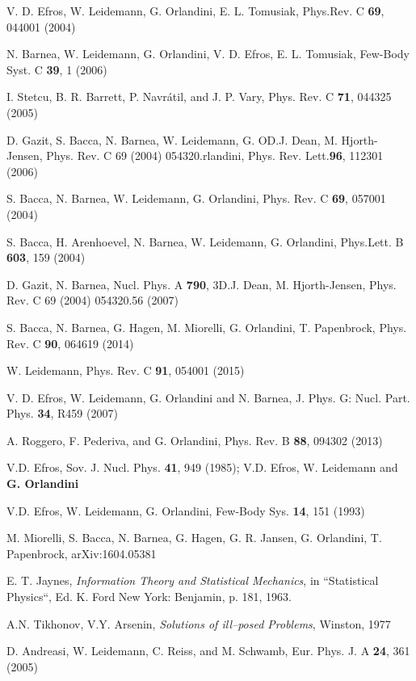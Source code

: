\begin{thebibliography}{00}
 V. D. Efros, W. Leidemann, G. Orlandini, E. L. Tomusiak,  Phys.Rev. C {\bf  69},  044001 (2004)

 N. Barnea, W. Leidemann, G. Orlandini, V. D. Efros, E. L. Tomusiak, Few-Body Syst. C {\bf 39}, 1 (2006)

 I. Stetcu, B. R. Barrett, P. Navr\'atil, and J. P. Vary, Phys. Rev. C \textbf{71}, 044325 (2005)

 D. Gazit, S. Bacca, N. Barnea, W. Leidemann, G. OD.J. Dean, M. Hjorth-Jensen, Phys. Rev. C 69 (2004) 054320.rlandini, Phys. Rev. Lett.{\bf  96}, 112301 (2006) 

 S. Bacca, N. Barnea, W. Leidemann, G. Orlandini, Phys. Rev. C {\bf 69}, 057001 (2004) 

 S. Bacca, H. Arenhoevel, N. Barnea, W. Leidemann, G. Orlandini,  Phys.Lett. B {\bf 603}, 159 (2004)

D. Gazit, N. Barnea, Nucl. Phys. A {\bf 790}, 3D.J. Dean, M. Hjorth-Jensen, Phys. Rev. C 69 (2004) 054320.56 (2007) 

 S. Bacca, N. Barnea, G. Hagen, M. Miorelli, G. Orlandini, T. Papenbrock, Phys. Rev. C {\bf 90}, 064619 (2014)

 W. Leidemann, Phys. Rev. C {\bf 91}, 054001 (2015) 

 V. D. Efros, W. Leidemann, G. Orlandini and N. Barnea,
J. Phys. G: Nucl. Part. Phys. {\bf 34}, R459 (2007)  

 A. Roggero, F. Pederiva, and G. Orlandini, Phys. Rev. B {\bf 88}, 094302 (2013)

 V.D. Efros, Sov. J. Nucl. Phys. {\bf 41}, 949 (1985); 
V.D. Efros, W. Leidemann and {\bf G. Orlandini}

 V.D. Efros,  W. Leidemann, G. Orlandini, Few-Body Sys. {\bf 14}, 151 (1993)

 M. Miorelli, S. Bacca, N. Barnea, G. Hagen, G. R. Jansen, G. Orlandini, T. Papenbrock, arXiv:1604.05381
 
  E. T. Jaynes, {\it Information Theory and Statistical Mechanics}, in “Statistical Physics“, Ed. K.
Ford New York: Benjamin, p. 181, 1963.

 A.N. Tikhonov, V.Y. Arsenin, {\it Solutions of ill--posed Problems}, Winston, 1977

D. Andreasi, W. Leidemann, C. Reiss, and M. Schwamb, Eur. Phys. J. A {\bf 24}, 361 (2005)

\end{thebibliography}



